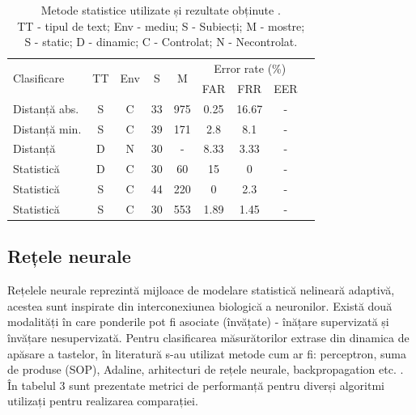 \documentclass[9pt,shortpaper,twoside,web]{ieeecolor}
\begin{document}
\begin{table}[H]
	\begin{tabular}[c]{lcccccccc}
	\hline
	\multirow{2}{*}{Clasificare} & \multirow{2}{*}{TT} & \multirow{2}{*}{Env} & \multirow{2}{*}{S} & \multirow{2}{*}{M} & \multicolumn{3}{c}{Error rate (\%)} \\
	\cline{6-8}
            &    &     &   &   &  FAR & FRR & EER \\
	\hline
	Distanță abs. & S & C & 33 & 975 & 0.25 & 16.67 & - \\
	Distanță min. & S & C & 39 & 171 & 2.8  &  8.1  & - \\
	Distanță      & D & N & 30 &  -  & 8.33 &  3.33 & - \\
	Statistică    & D & C & 30 & 60  &15    &  0    & - \\
	Statistică    & S & C & 44 &220  & 0    &  2.3  & - \\
	Statistică    & S & C & 30 &553  & 1.89 &  1.45 & - \\
	\hline
	\end{tabular}
	
\caption{
Metode statistice utilizate și rezultate obținute \cite{b3}.\\
TT - tipul de text; Env - mediu; S - Subiecți; M - mostre;\\
S - static; D - dinamic; C - Controlat; N - Necontrolat.}
\end{table}

\subsection{Rețele neurale}
	Rețelele neurale reprezintă mijloace de modelare statistică nelineară adaptivă, acestea sunt inspirate din interconexiunea biologică a neuronilor. Există două modalități în care ponderile pot fi asociate (învățate) - înățare supervizată și învățare nesupervizată. Pentru clasificarea măsurătorilor extrase din dinamica de apăsare a tastelor, în literatură s-au utilizat metode cum ar fi: perceptron, suma de produse (SOP), Adaline, arhitecturi de rețele neurale, backpropagation etc. \cite{b3}. În tabelul 3 sunt prezentate metrici de performanță pentru diverși algoritmi utilizați pentru realizarea comparației.\\
\end{document}
